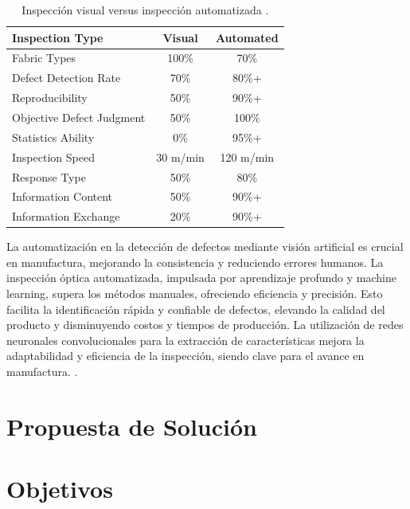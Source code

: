 \begin{table}[H]
	\centering
	\caption[Inspección visual versus inspección automatizada.]{Inspección visual versus inspección automatizada \cite{Islam2006ASuitable}.}
	\begin{tabular}{|p{13em}|c|c|}
		\hline
		\textbf{Inspection Type} & {\textbf{Visual}} & \textbf{Automated} \bigstrut\\
		\hline
		Fabric Types & 100\% & \multicolumn{1}{c|}{70\%} \bigstrut\\
		\hline
		Defect Detection Rate & 70\%  & 80\%+ \bigstrut\\
		\hline
		Reproducibility & 50\%  & 90\%+ \bigstrut\\
		\hline
		Objective Defect Judgment & 50\%  & {100\%} \bigstrut\\
		\hline
		Statistics Ability & 0\%   & 95\%+ \bigstrut\\
		\hline
		Inspection Speed & {30 m/min} & {120 m/min} \bigstrut\\
		\hline
		Response Type & 50\%  & {80\%} \bigstrut\\
		\hline
		Information Content & 50\%  & 90\%+ \bigstrut\\
		\hline
		Information Exchange & 20\%  & 90\%+ \bigstrut\\
		\hline
	\end{tabular}%
	\label{tab:visual_vs_automated}%
\end{table}%

La automatización en la detección de defectos mediante visión artificial es crucial en manufactura, mejorando la consistencia y reduciendo errores humanos. La inspección óptica automatizada, impulsada por aprendizaje profundo y machine learning, supera los métodos manuales, ofreciendo eficiencia y precisión. Esto facilita la identificación rápida y confiable de defectos, elevando la calidad del producto y disminuyendo costos y tiempos de producción. La utilización de redes neuronales convolucionales para la extracción de características mejora la adaptabilidad y eficiencia de la inspección, siendo clave para el avance en manufactura. \cite{SanchezRomero2023}.

\section{Propuesta de Solución}

\section{Objetivos}

